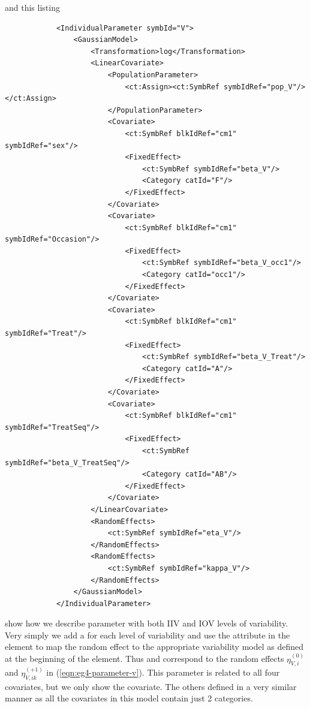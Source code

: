 and this listing 
\lstset{language=XML}
\begin{lstlisting}
            <IndividualParameter symbId="V">
                <GaussianModel>
                    <Transformation>log</Transformation>
                    <LinearCovariate>
                        <PopulationParameter>
                            <ct:Assign><ct:SymbRef symbIdRef="pop_V"/></ct:Assign>
                        </PopulationParameter>
                        <Covariate>
                            <ct:SymbRef blkIdRef="cm1" symbIdRef="sex"/>
                            <FixedEffect>
                                <ct:SymbRef symbIdRef="beta_V"/>
                                <Category catId="F"/>
                            </FixedEffect>
                        </Covariate>
                        <Covariate>
                            <ct:SymbRef blkIdRef="cm1" symbIdRef="Occasion"/>
                            <FixedEffect>
                                <ct:SymbRef symbIdRef="beta_V_occ1"/>
                                <Category catId="occ1"/>
                            </FixedEffect>
                        </Covariate>
                        <Covariate>
                            <ct:SymbRef blkIdRef="cm1" symbIdRef="Treat"/>
                            <FixedEffect>
                                <ct:SymbRef symbIdRef="beta_V_Treat"/>
                                <Category catId="A"/>
                            </FixedEffect>
                        </Covariate>
                        <Covariate>
                            <ct:SymbRef blkIdRef="cm1" symbIdRef="TreatSeq"/>
                            <FixedEffect>
                                <ct:SymbRef symbIdRef="beta_V_TreatSeq"/>
                                <Category catId="AB"/>
                            </FixedEffect>
                        </Covariate>
                    </LinearCovariate>
                    <RandomEffects>
                        <ct:SymbRef symbIdRef="eta_V"/>
                    </RandomEffects>
                    <RandomEffects>
                        <ct:SymbRef symbIdRef="kappa_V"/>
                    </RandomEffects>
                </GaussianModel>
            </IndividualParameter>
\end{lstlisting}

show how we describe parameter
 with both IIV and IOV levels of variability. Very simply we
add a  for each level of variability and use
the  attribute in the  element 
to map the random effect to the appropriate variability model as defined at 
the beginning of the  element. 
Thus  and  correspond to the 
random effects $\eta^{(0)}_{V,i}$ and $\eta^{(+1)}_{V,ik}$ in
(\ref{eqn:eg4-parameter-v}). This parameter is related to all four
covariates, but we only show the  covariate. The others
defined in a very similar manner as all the covariates in this model
contain just 2 categories.

